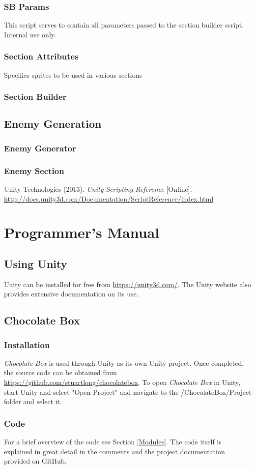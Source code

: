 \documentclass[pdftex,12pt,letter]{article}
\begin{document}
\subsubsection{SB Params}
This script serves to contain all parameters passed to the section builder script. Internal use only.
\subsubsection{Section Attributes}
Specifies sprites to be used in various sections
\subsubsection{Section Builder}
\subsection{Enemy Generation}
\subsubsection{Enemy Generator}
\subsubsection{Enemy Section}

\begin{thebibliography}{3}
Unity Technologies (2013). \textit{Unity Scripting Reference} [Online]. \url{http://docs.unity3d.com/Documentation/ScriptReference/index.html}
\end{thebibliography}

\newpage
\appendix
\section{Programmer's Manual}
\subsection{Using Unity}
Unity can be installed for free from \url{https://unity3d.com/}. The Unity website also provides extensive documentation on its use.
\subsection{Chocolate Box}
\subsubsection{Installation}
\textit{Chocolate Box} is used through Unity as its own Unity project. Once completed, the source code can be obtained from \url{https://github.com/stuartlong/chocolatebox}. To open \textit{Chocolate Box} in Unity, start Unity and select "Open Project" and navigate to the /ChocolateBox/Project folder and select it.
\subsubsection{Code}
For a brief overview of the code see Section \ref{Modules}. The code itself is explained in great detail in the comments and the project documentation provided on GitHub.

\FloatBarrier
\end{document}
